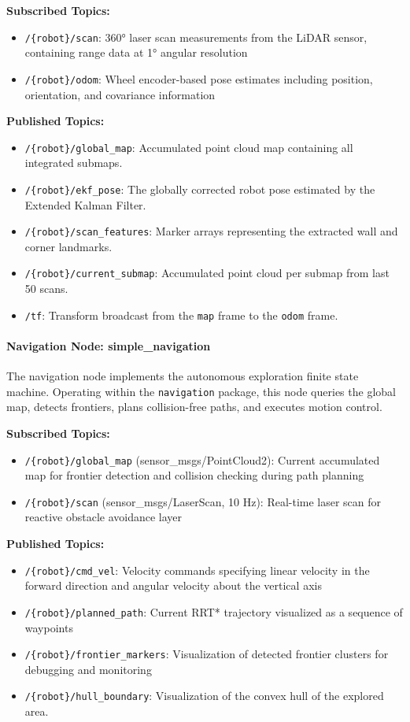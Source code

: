 \documentclass[11pt]{article}
\begin{document}
\textbf{Subscribed Topics:}
\begin{itemize}
	\item \texttt{/\{robot\}/scan}: 360° laser scan measurements from the LiDAR sensor, containing range data at 1° angular resolution
	\item \texttt{/\{robot\}/odom}: Wheel encoder-based pose estimates including position, orientation, and covariance information
	
\end{itemize}

\textbf{Published Topics:}
\begin{itemize}
	\item \texttt{/\{robot\}/global\_map}: Accumulated point cloud map containing all integrated submaps.
	\item \texttt{/\{robot\}/ekf\_pose}: The globally corrected robot pose estimated by the Extended Kalman Filter.
	\item \texttt{/\{robot\}/scan\_features}: Marker arrays representing the extracted wall and corner landmarks.
	\item \texttt{/\{robot\}/current\_submap}: Accumulated point cloud per submap from last 50 scans.
	\item \texttt{/tf}: Transform broadcast from the \texttt{map} frame to the \texttt{odom} frame.
\end{itemize}


\paragraph{Navigation Node: simple\_navigation}

The navigation node implements the autonomous exploration finite state machine. Operating within the \texttt{navigation} package, this node queries the global map, detects frontiers, plans collision-free paths, and executes motion control.

\textbf{Subscribed Topics:}
\begin{itemize}
	\item \texttt{/\{robot\}/global\_map} (sensor\_msgs/PointCloud2): Current accumulated map for frontier detection and collision checking during path planning
	\item \texttt{/\{robot\}/scan} (sensor\_msgs/LaserScan, 10 Hz): Real-time laser scan for reactive obstacle avoidance layer
\end{itemize}

\textbf{Published Topics:}
\begin{itemize}
	\item \texttt{/\{robot\}/cmd\_vel}: Velocity commands specifying linear velocity in the forward direction and angular velocity about the vertical axis
	\item \texttt{/\{robot\}/planned\_path}: Current RRT* trajectory visualized as a sequence of waypoints
	\item \texttt{/\{robot\}/frontier\_markers}: Visualization of detected frontier clusters for debugging and monitoring
	\item \texttt{/\{robot\}/hull\_boundary}: Visualization of the convex hull of the explored area.
\end{itemize}
\end{document}
